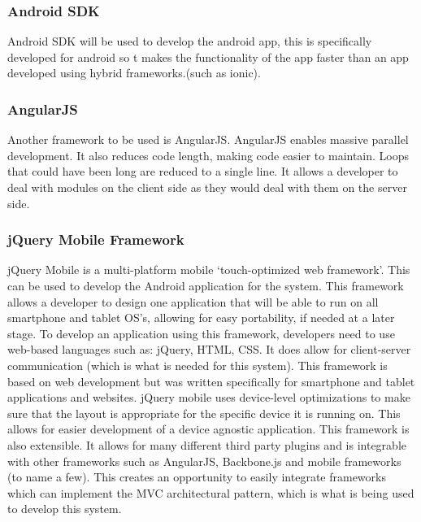 \documentclass[a4paper,12pt]{article}
\begin{document}
\subsubsection{Android SDK}Android SDK will be used to develop the android app, this is specifically developed for android so t makes the functionality of the app faster than an app developed using hybrid frameworks.(such as ionic).\par
\subsubsection{AngularJS}Another framework to be used is AngularJS. AngularJS enables massive parallel development. It also reduces code length, making code easier to maintain. Loops that could have been long are reduced to a single line. It allows a developer to deal with modules on the client side as they would deal with them on the server side.\par  


\subsubsection{jQuery Mobile Framework}
jQuery Mobile is a multi-platform mobile `touch-optimized web framework'. This can be used to develop the Android application for the system. This framework allows a developer to design one application that will be able to run on all smartphone and tablet OS's, allowing for easy portability, if needed at a later stage. To develop an application using this framework, developers need to use web-based languages such as: jQuery, HTML, CSS. It does allow for client-server communication (which is what is needed for this system). This framework is based on web development but was written specifically for smartphone and tablet applications and websites. jQuery mobile uses device-level optimizations to make sure that the layout is appropriate for the specific device it is running on. This allows for easier development of a device agnostic application. This framework is also extensible. It allows for many different third party plugins and is integrable with other frameworks such as AngularJS, Backbone.js and mobile frameworks (to name a few). This creates an opportunity to easily integrate frameworks which can implement the MVC architectural pattern, which is what is being used to develop this system.
\end{document}
